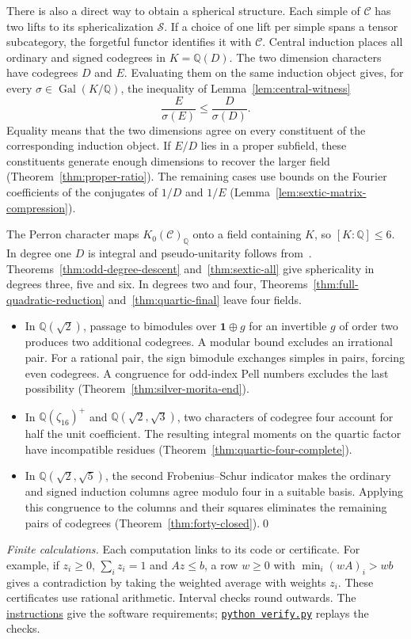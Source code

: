 \documentclass[11pt,reqno]{amsart}
\newcommand{\codecheck}[2]{\href{https://github.com/sebastienpalcoux/grothendieck-ring-classification/blob/d5750105bb5758f3ad38d2e5464dfcc12c019816/supplements/rank6/sphericality/#1}{#2}}
\theoremstyle{remark}\newtheorem{remark}[theorem]{Remark}
\numberwithin{equation}{section}
\begin{document}
There is also a direct way to obtain a spherical structure. Each
simple of $\mathcal C$ has two lifts to its sphericalization
$\mathcal S$. If a choice of one lift per simple spans a tensor
subcategory, the forgetful functor identifies it with $\mathcal C$.
Central induction places all ordinary and signed codegrees in
$K=\mathbb Q(D)$. The two dimension characters have codegrees $D$
and $E$. Evaluating them on the same induction object gives, for
every $\sigma\in\operatorname{Gal}(K/\mathbb Q)$,
the inequality of Lemma~\ref{lem:central-witness}
\[
       \frac{E}{\sigma(E)}\le\frac{D}{\sigma(D)}.
\]
Equality means that the two dimensions agree on every constituent of
the corresponding induction object. If $E/D$ lies in a proper
subfield, these constituents generate enough dimensions to recover
the larger field (Theorem~\ref{thm:proper-ratio}). The remaining
cases use bounds on the Fourier coefficients of the conjugates of
$1/D$ and $1/E$ (Lemma~\ref{lem:sextic-matrix-compression}).

The Perron character maps $K_0(\mathcal C)_{\mathbb Q}$ onto a field
containing $K$, so $[K:\mathbb Q]\le6$.
In degree one $D$ is integral and pseudo-unitarity follows
from~\cite[Proposition~8.24]{ENO}. Theorems~\ref{thm:odd-degree-descent}
and~\ref{thm:sextic-all} give sphericality in degrees three, five and
six. In degrees two and four, Theorems~\ref{thm:full-quadratic-reduction}
and~\ref{thm:quartic-final} leave four fields.
\begin{itemize}
\item In $\mathbb Q(\sqrt2)$, passage to bimodules over
$\mathbf1\oplus g$ for an invertible $g$ of order two produces two
additional codegrees. A modular bound excludes an irrational pair.
For a rational pair, the sign bimodule exchanges simples in pairs,
forcing even codegrees. A congruence for odd-index Pell numbers
excludes the last possibility
(Theorem~\ref{thm:silver-morita-end}).
\item In $\mathbb Q(\zeta_{16})^+$ and $\mathbb Q(\sqrt2,\sqrt3)$,
two characters of codegree four account for half the unit coefficient.
The resulting integral moments on the quartic factor have incompatible
residues (Theorem~\ref{thm:quartic-four-complete}).
\item In $\mathbb Q(\sqrt2,\sqrt5)$, the second Frobenius--Schur
indicator makes the ordinary and signed induction columns agree modulo
four in a suitable basis. Applying this congruence to the columns and
their squares eliminates the remaining pairs of codegrees
(Theorem~\ref{thm:forty-closed}).\qed
\end{itemize}
\smallskip\noindent
\emph{Finite calculations.} Each computation links to its code or
certificate. For example, if $z_i\ge0$, $\sum_i z_i=1$ and $Az\le b$,
a row $w\ge0$ with $\min_i(wA)_i>wb$ gives a contradiction by taking
the weighted average with weights $z_i$. These certificates use
rational arithmetic. Interval checks round outwards. The
\codecheck{README.md}{instructions} give the software requirements;
\codecheck{verify.py}{\texttt{python verify.py}} replays the checks.
\end{document}
